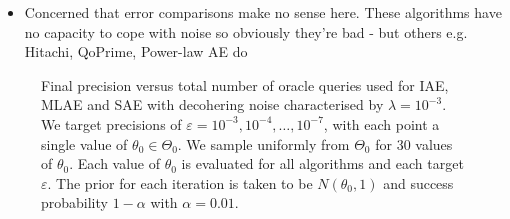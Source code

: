 \begin{itemize}
	\color{red}
	\item Concerned that error comparisons make no sense here. These algorithms have no capacity to cope with noise so obviously they're bad - but others e.g. Hitachi, QoPrime, Power-law AE do
\end{itemize}

\begin{figure}[htbp]
	\centering
	\caption{Final precision versus total number of oracle queries used for IAE, MLAE and SAE with decohering noise characterised by $\lambda = 10^{-3}$. We target precisions of $\varepsilon = 10^{-3}, 10^{-4}, \ldots , 10^{-7}$, with each point a single value of $\theta_0 \in \Theta_0$. We sample uniformly from $\Theta_0$ for 30 values of $\theta_0$. Each value of $\theta_0$ is evaluated for all algorithms and each target $\varepsilon$. The prior for each iteration is taken to be $N(\theta_0, 1)$ and success probability $1 - \alpha$ with $\alpha = 0.01$.}
	\label{fig::query-comparison-noisy}
\end{figure}

\newpage



